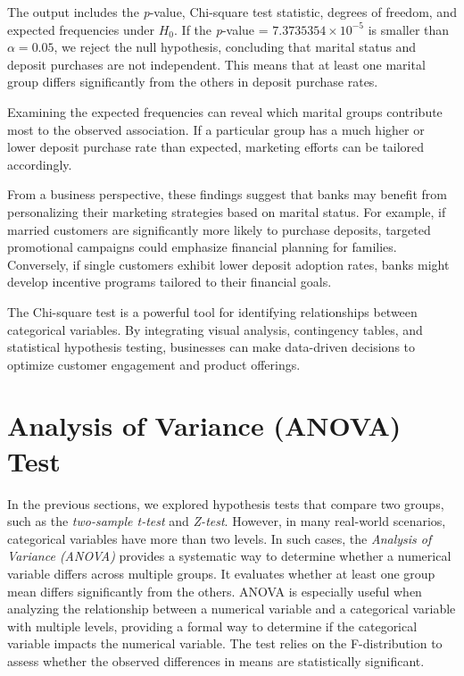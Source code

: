 \documentclass[
]{book}
\theoremstyle{definition}
\theoremstyle{definition}
\theoremstyle{definition}
\theoremstyle{definition}
\theoremstyle{remark}
\begin{document}
The output includes the \emph{p}-value, Chi-square test statistic, degrees of freedom, and expected frequencies under \(H_0\). If the \emph{p}-value = \ensuremath{7.3735354\times 10^{-5}} is smaller than \(\alpha = 0.05\), we reject the null hypothesis, concluding that marital status and deposit purchases are not independent. This means that at least one marital group differs significantly from the others in deposit purchase rates.

Examining the expected frequencies can reveal which marital groups contribute most to the observed association. If a particular group has a much higher or lower deposit purchase rate than expected, marketing efforts can be tailored accordingly.

From a business perspective, these findings suggest that banks may benefit from personalizing their marketing strategies based on marital status. For example, if married customers are significantly more likely to purchase deposits, targeted promotional campaigns could emphasize financial planning for families. Conversely, if single customers exhibit lower deposit adoption rates, banks might develop incentive programs tailored to their financial goals.

The Chi-square test is a powerful tool for identifying relationships between categorical variables. By integrating visual analysis, contingency tables, and statistical hypothesis testing, businesses can make data-driven decisions to optimize customer engagement and product offerings.

\section{Analysis of Variance (ANOVA) Test}\label{analysis-of-variance-anova-test}

In the previous sections, we explored hypothesis tests that compare two groups, such as the \emph{two-sample t-test} and \emph{Z-test}. However, in many real-world scenarios, categorical variables have more than two levels. In such cases, the \emph{Analysis of Variance (ANOVA)} provides a systematic way to determine whether a numerical variable differs across multiple groups. It evaluates whether at least one group mean differs significantly from the others. ANOVA is especially useful when analyzing the relationship between a numerical variable and a categorical variable with multiple levels, providing a formal way to determine if the categorical variable impacts the numerical variable. The test relies on the F-distribution to assess whether the observed differences in means are statistically significant.
\end{document}
